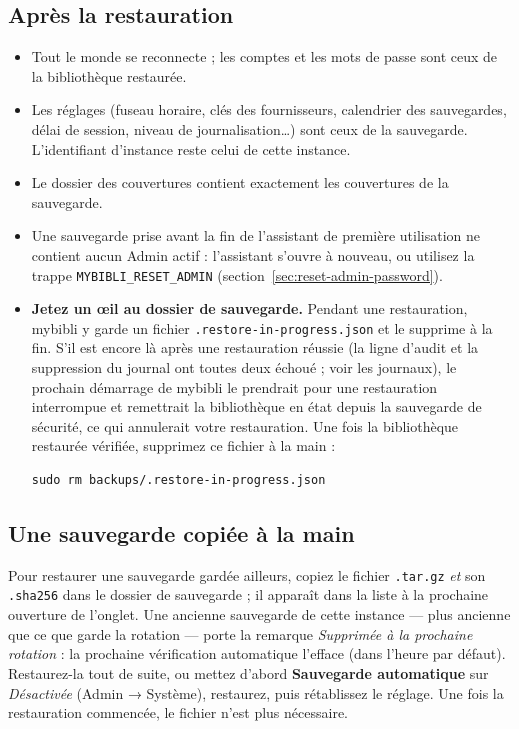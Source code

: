 \subsection*{Après la restauration}

\begin{itemize}
  \item Tout le monde se reconnecte ; les comptes et les mots de passe
        sont ceux de la bibliothèque restaurée.
  \item Les réglages (fuseau horaire, clés des fournisseurs, calendrier
        des sauvegardes, délai de session, niveau de journalisation\dots)
        sont ceux de la sauvegarde. L'identifiant d'instance reste celui
        de cette instance.
  \item Le dossier des couvertures contient exactement les couvertures
        de la sauvegarde.
  \item Une sauvegarde prise avant la fin de l'assistant de première
        utilisation ne contient aucun Admin actif : l'assistant s'ouvre
        à nouveau, ou utilisez la trappe \texttt{MYBIBLI\_RESET\_ADMIN}
        (section~\ref{sec:reset-admin-password}).
  \item \textbf{Jetez un œil au dossier de sauvegarde.} Pendant une
        restauration, mybibli y garde un fichier
        \texttt{.restore-\allowbreak in-\allowbreak progress.json} et le supprime à la fin. S'il
        est encore là après une restauration réussie (la ligne d'audit
        et la suppression du journal ont toutes deux échoué ; voir les
        journaux), le prochain démarrage de mybibli le prendrait
        pour une restauration interrompue et remettrait la bibliothèque
        en état depuis la sauvegarde de sécurité, ce qui annulerait
        votre restauration. Une fois la bibliothèque restaurée vérifiée,
        supprimez ce fichier à la main :
\begin{lstlisting}
sudo rm backups/.restore-in-progress.json
\end{lstlisting}
\end{itemize}

\subsection*{Une sauvegarde copiée à la main}

Pour restaurer une sauvegarde gardée ailleurs, copiez le fichier
\texttt{.tar.gz} \emph{et} son \texttt{.sha256} dans le dossier de
sauvegarde ; il apparaît dans la liste à la prochaine ouverture de
l'onglet. Une ancienne sauvegarde de cette instance --- plus ancienne que
ce que garde la rotation --- porte la remarque \emph{Supprimée à la
prochaine rotation} : la prochaine vérification automatique l'efface
(dans l'heure par défaut). Restaurez-la tout de suite, ou mettez d'abord
\textbf{Sauvegarde automatique} sur \emph{Désactivée} (Admin → Système),
restaurez, puis rétablissez le réglage. Une fois la restauration
commencée, le fichier n'est plus nécessaire.


